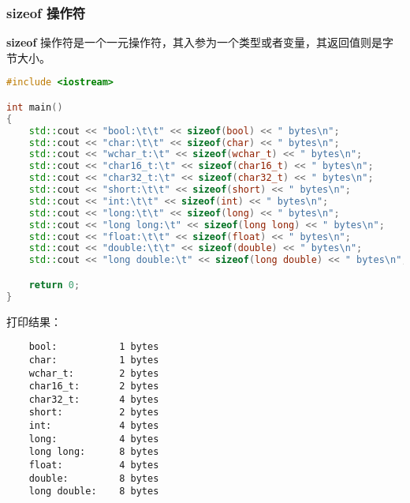 \documentclass[../../LearnCpp.tex]{subfiles}
\begin{document}
\subsubsection*{sizeof 操作符}

\textbf{sizeof} 操作符是一个一元操作符，其入参为一个类型或者变量，其返回值则是字节大小。

\begin{lstlisting}[language=C++]
#include <iostream>

int main()
{
    std::cout << "bool:\t\t" << sizeof(bool) << " bytes\n";
    std::cout << "char:\t\t" << sizeof(char) << " bytes\n";
    std::cout << "wchar_t:\t" << sizeof(wchar_t) << " bytes\n";
    std::cout << "char16_t:\t" << sizeof(char16_t) << " bytes\n";
    std::cout << "char32_t:\t" << sizeof(char32_t) << " bytes\n";
    std::cout << "short:\t\t" << sizeof(short) << " bytes\n";
    std::cout << "int:\t\t" << sizeof(int) << " bytes\n";
    std::cout << "long:\t\t" << sizeof(long) << " bytes\n";
    std::cout << "long long:\t" << sizeof(long long) << " bytes\n";
    std::cout << "float:\t\t" << sizeof(float) << " bytes\n";
    std::cout << "double:\t\t" << sizeof(double) << " bytes\n";
    std::cout << "long double:\t" << sizeof(long double) << " bytes\n";

    return 0;
}
\end{lstlisting}

打印结果：

\begin{verbatim}
    bool:           1 bytes
    char:           1 bytes
    wchar_t:        2 bytes
    char16_t:       2 bytes
    char32_t:       4 bytes
    short:          2 bytes
    int:            4 bytes
    long:           4 bytes
    long long:      8 bytes
    float:          4 bytes
    double:         8 bytes
    long double:    8 bytes
\end{verbatim}
\end{document}
